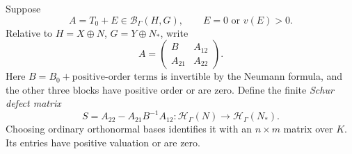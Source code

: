 \documentclass[11pt,letterpaper]{article}
\numberwithin{equation}{section}
\theoremstyle{definition}
\theoremstyle{remark}
\newcommand{\K}{K}
\newcommand{\HH}[1]{\mathscr H_\Gamma(#1)}
\newcommand{\BB}[2]{\mathscr B_\Gamma(#1,#2)}
\begin{document}
Suppose
\[
 A=T_0+E\in\BB{H}{G},\qquad E=0\text{ or }v(E)>0.
\]
Relative to $H=X\oplus N$, $G=Y\oplus N_*$, write
\begin{equation}\label{hgeo:eq:blocks}
 A=\begin{pmatrix}B&A_{12}\\A_{21}&A_{22}\end{pmatrix}.
\end{equation}
Here $B=B_0+\text{positive-order terms}$ is invertible by the
Neumann formula, and the other three blocks have positive order
or are zero. Define the finite \emph{Schur defect matrix}
\begin{equation}\label{hgeo:eq:schur}
 S=A_{22}-A_{21}B^{-1}A_{12}:\HH{N}\longrightarrow\HH{N_*}.
\end{equation}
Choosing ordinary orthonormal bases identifies it with an
$n\times m$ matrix over $\K$. Its entries have positive valuation
or are zero.
\end{document}
